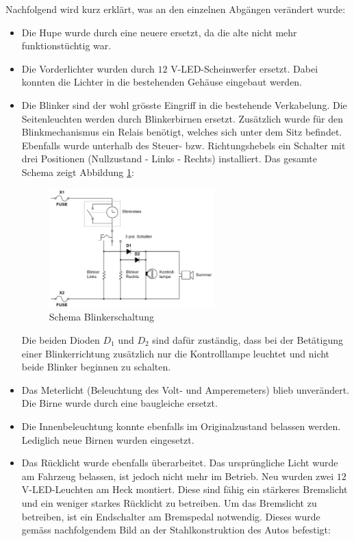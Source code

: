 \newpage

Nachfolgend wird kurz erklärt, was an den einzelnen Abgängen verändert wurde:
\begin{itemize}
\item Die Hupe wurde durch eine neuere ersetzt, da die alte nicht mehr funktionstüchtig war.
\item Die Vorderlichter wurden durch $12$ V-LED-Scheinwerfer ersetzt. Dabei konnten die Lichter in die bestehenden Gehäuse eingebaut werden.
\item Die Blinker sind der wohl grösste Eingriff in die bestehende Verkabelung. Die Seitenleuchten werden durch Blinkerbirnen ersetzt. Zusätzlich wurde für den Blinkmechanismus ein Relais benötigt, welches sich unter dem Sitz befindet. Ebenfalls wurde unterhalb des Steuer- bzw. Richtungshebels ein Schalter mit drei Positionen (Nullzustand - Links - Rechts) installiert. Das gesamte Schema zeigt Abbildung \ref{fig:SchemaBlinkerschaltung}:

\begin{figure}[h]
	\centering
		\includegraphics[width=0.6\textwidth]{images/Blinkerschaltung_Schema}
	\caption{Schema Blinkerschaltung}
	\label{fig:SchemaBlinkerschaltung}
\end{figure}

Die beiden Dioden $D_1$ und $D_2$ sind dafür zuständig, dass bei der Betätigung einer Blinkerrichtung zusätzlich nur die Kontrolllampe leuchtet und nicht beide Blinker beginnen zu schalten.
\item Das Meterlicht (Beleuchtung des Volt- und Amperemeters) blieb unverändert. Die Birne wurde durch eine baugleiche ersetzt.
\item Die Innenbeleuchtung konnte ebenfalls im Originalzustand belassen werden. Lediglich neue Birnen wurden eingesetzt.
\newpage
\item Das Rücklicht wurde ebenfalls überarbeitet. Das ursprüngliche Licht wurde am Fahrzeug belassen, ist jedoch nicht mehr im Betrieb. Neu wurden zwei $12$ V-LED-Leuchten am Heck montiert. Diese sind fähig ein stärkeres Bremslicht und ein weniger starkes Rücklicht zu betreiben. Um das Bremslicht zu betreiben, ist ein Endschalter am Bremspedal notwendig. Dieses wurde gemäss nachfolgendem Bild an der Stahlkonstruktion des Autos befestigt:


\end{itemize}
